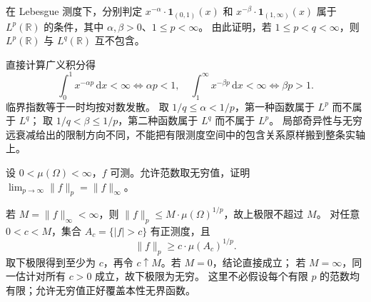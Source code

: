 \begin{exercise}\label{b1:ex:10-power-ranges}
在 Lebesgue 测度下，分别判定 \(x^{-\alpha}\cdot\mathbf1_{(0,1)}(x)\) 和
\(x^{-\beta}\cdot\mathbf1_{(1,\infty)}(x)\) 属于 \(L^p(\mathbb R)\) 的条件，其中 \(\alpha,\beta>0\)、\(1\leq p<\infty\)。
由此证明，若 \(1\leq p<q<\infty\)，则 \(L^p(\mathbb R)\) 与 \(L^q(\mathbb R)\) 互不包含。
\end{exercise}
\begin{solution}
直接计算广义积分得
\[
 \int_0^1x^{-\alpha p}\,\mathrm{d}x<\infty\iff\alpha p<1,
 \quad \int_1^\infty x^{-\beta p}\,\mathrm{d}x<\infty\iff\beta p>1.
\]
临界指数等于一时均按对数发散。
取 \(1/q\leq\alpha<1/p\)，第一种函数属于 \(L^p\) 而不属于 \(L^q\)；
取 \(1/q<\beta\leq1/p\)，第二种函数属于 \(L^q\) 而不属于 \(L^p\)。
局部奇异性与无穷远衰减给出的限制方向不同，不能把有限测度空间中的包含关系原样搬到整条实轴上。
\end{solution}

\begin{exercise}\label{b1:ex:10-p-to-infinity}
设 \(0<\mu(\Omega)<\infty\)，\(f\) 可测。允许范数取无穷值，证明
\(\lim_{p\to\infty}\|f\|_p=\|f\|_\infty\)。
\end{exercise}
\begin{solution}
若 \(M=\|f\|_\infty<\infty\)，则 \(\|f\|_p\leq M\cdot\mu(\Omega)^{1/p}\)，故上极限不超过 \(M\)。
对任意 \(0<c<M\)，集合 \(A_c=\{|f|>c\}\) 有正测度，且
\[
 \|f\|_p\geq c\cdot\mu(A_c)^{1/p}.
\]
取下极限得到至少为 \(c\)，再令 \(c\uparrow M\)。若 \(M=0\)，结论直接成立；
若 \(M=\infty\)，同一估计对所有 \(c>0\) 成立，故下极限为无穷。
这里不必假设每个有限 \(p\) 的范数均有限；允许无穷值正好覆盖本性无界函数。
\end{solution}


